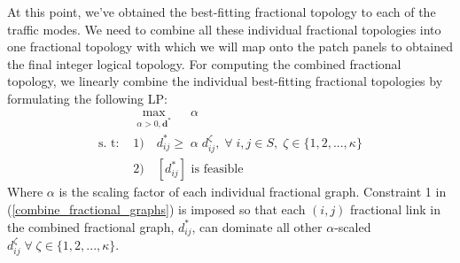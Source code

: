 \documentclass[sigconf]{acmart}
\theoremstyle{definition}
\begin{document}
At this point, we've obtained the best-fitting fractional topology to each of the traffic modes. We need to combine all these individual fractional topologies into one fractional topology with which we will map onto the patch panels to obtained the final integer logical topology. For computing the combined fractional topology, we linearly combine the individual best-fitting fractional topologies by formulating the following LP:
\begin{equation}
\begin{aligned}
 & \max\limits_{\alpha > 0, \mathbf{d}^*} \; \quad \alpha \\
 \text{s. t: } & 1) \quad d_{ij}^* \geq \; \alpha \; d_{ij}^\zeta, \; \forall \; i, j \in S, \; \zeta \in \{1, 2, ..., \kappa\} \\
  & 2) \quad [d_{ij}^*] \text{ is feasible}
\end{aligned}\label{combine_fractional_graphs}
\end{equation}
Where $\alpha$ is the scaling factor of each individual fractional graph. Constraint 1 in (\ref{combine_fractional_graphs}) is imposed so that each $(i, j)$ fractional link in the combined fractional graph, $d_{ij}^*$, can dominate all other $\alpha$-scaled $d_{ij}^\zeta \; \forall \; \zeta \in \{1,2, ..., \kappa\}$.
\end{document}
